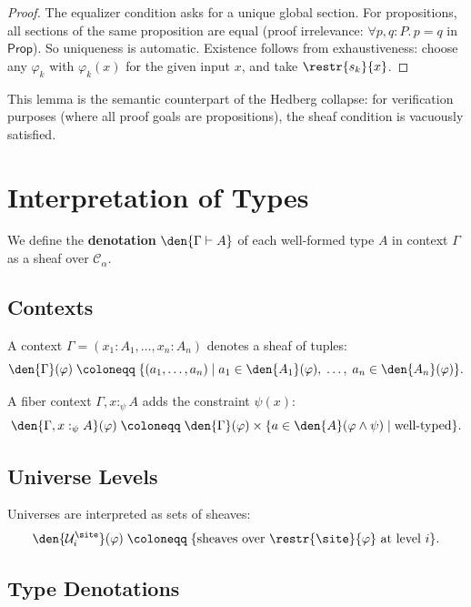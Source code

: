 \begin{proof}
The equalizer condition asks for a unique global section.
For propositions, all sections of the same proposition are equal
(proof irrelevance: \(\forall p, q : P.\, p = q\) in \(\mathsf{Prop}\)).
So uniqueness is automatic.  Existence follows from exhaustiveness:
choose any \(\varphi_k\) with \(\varphi_k(x)\) for the given
input \(x\), and take \(\restr{s_k}{x}\).
\end{proof}

This lemma is the semantic counterpart of the Hedberg collapse:
for verification purposes (where all proof goals are propositions),
the sheaf condition is vacuously satisfied.


\section{Interpretation of Types}
\label{sec:type-interpretation}

We define the \textbf{denotation} \(\den{\Gamma \vdash A}\) of each
well-formed type \(A\) in context \(\Gamma\) as a sheaf over
\(\mathcal{C}_\alpha\).

\subsection{Contexts}

A context \(\Gamma = (x_1 : A_1, \ldots, x_n : A_n)\) denotes a
sheaf of tuples:
\[
  \den{\Gamma}(\varphi) \;\coloneqq\;
  \{(a_1, \ldots, a_n) \mid
    a_1 \in \den{A_1}(\varphi),\;
    \ldots,\;
    a_n \in \den{A_n}(\varphi) \}.
\]

A fiber context \(\Gamma, x :_\psi A\) adds the constraint
\(\psi(x)\):
\[
  \den{\Gamma, x :_\psi A}(\varphi) \;\coloneqq\;
  \den{\Gamma}(\varphi) \times
  \{a \in \den{A}(\varphi \wedge \psi) \mid \text{well-typed}\}.
\]

\subsection{Universe Levels}

Universes are interpreted as sets of sheaves:
\[
  \den{\mathcal{U}_i^{\site}}(\varphi)
  \;\coloneqq\;
  \{\text{sheaves over } \restr{\site}{\varphi}\text{ at level } i\}.
\]

\subsection{Type Denotations}

